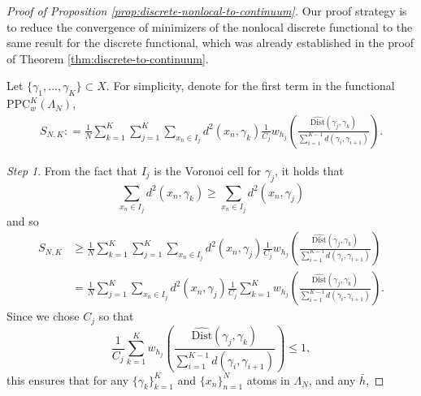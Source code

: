 \documentclass[10pt,a4paper]{amsart}
\begin{document}
\begin{proof}[Proof of Proposition \ref{prop:discrete-nonlocal-to-continuum}]
Our proof strategy is to reduce the convergence of minimizers of the nonlocal
discrete functional to the same result for the discrete functional, which was already established in the proof of Theorem \ref{thm:discrete-to-continuum}.

Let  $\{\gamma_1, ..., \gamma_K\}\subset X$.
 For simplicity,  denote for the first term in the functional $\text{PPC}_{w}^{K}(\Lambda_{N})$,
\begin{align*}
  S_{N,K} : =  \frac{1}{N}\sum_{k=1}^{K}\sum_{j=1}^{K}\sum_{x_{n}\in I_{j}}d^{2}(x_{n},\gamma_{k})\frac{1}{C_{j}}w_{h_{j}}\left(\frac{\widehat{\text{Dist}}(\gamma_{j},\gamma_{k})}{\sum_{i=1}^{K-1}d(\gamma_{i},\gamma_{i+1})}\right).
\end{align*}



\emph{Step 1}. From the fact that $I_{j}$
is the Voronoi cell for $\gamma_{j}$, it holds that
\[
\sum_{x_{n}\in I_{j}}d^{2}(x_{n},\gamma_{k})\geq\sum_{x_{n}\in I_{j}}d^{2}(x_{n},\gamma_{j})
\]
and so
\begin{align*}
 S_{N,K} & \geq\frac{1}{N}\sum_{k=1}^{K}\sum_{j=1}^{K}\sum_{x_{n}\in I_{j}}d^{2}(x_{n},\gamma_{j})\frac{1}{C_{j}}w_{h_{j}}\left(\frac{\widehat{\text{Dist}}(\gamma_{j},\gamma_{k})}{\sum_{i=1}^{K-1}d(\gamma_{i},\gamma_{i+1})}\right)\\
 & =\frac{1}{N}\sum_{j=1}^{K}\sum_{x_{n}\in I_{j}}d^{2}(x_{n},\gamma_{j})\frac{1}{C_{j}}\sum_{k=1}^{K}w_{h_{j}}\left(\frac{\widehat{\text{Dist}}(\gamma_{j},\gamma_{k})}{\sum_{i=1}^{K-1}d(\gamma_{i},\gamma_{i+1})}\right).
\end{align*}
Since we chose $C_{j}$ so that
\[
\frac{1}{C_{j}}\sum_{k=1}^{K}w_{h_{j}}\left(\frac{\widehat{\text{Dist}}(\gamma_{j},\gamma_{k})}{\sum_{i=1}^{K-1}d(\gamma_{i},\gamma_{i+1})}\right) \leq 1,
\]
this ensures that for any $\{\gamma_{k}\}_{k=1}^{K}$ and $\{x_{n}\}_{n=1}^{N}$
atoms in $\Lambda_{N}$, and any $\bar{h}$,


\end{proof}
\end{document}
